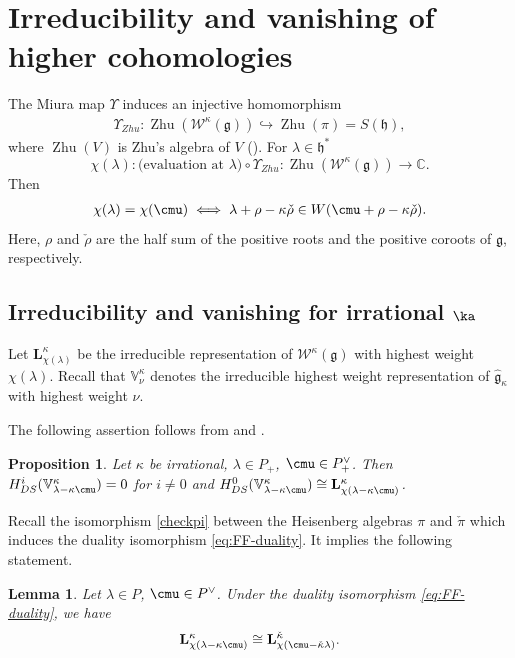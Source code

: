 \documentclass{amsart}
\newcommand{\on}{\operatorname}
\newcommand{\+}{\mathop{\oplus}}
\renewcommand{\*}{{\otimes}}
\newcommand{\mf}{\mathfrak}
\newcommand{\g}{\mf{g}}
\newcommand{\h}{\mf{h}}
\newcommand{\affg}{\widehat{\mf{g}}}
\newcommand{\C}{\mathbb{C}}
\newcommand{\W}{\mathscr{W}}
\newcommand{\ra}{\rightarrow}
\newcommand{\lam}{\lambda}
\theoremstyle{theorem}
\newtheorem{Pro}[Th]{Proposition}
\newtheorem{Lem}[Th]{Lemma}
\theoremstyle{remark}
\numberwithin{equation}{section}
\begin{document}
\section{Irreducibility and vanishing of higher
  cohomologies}\label{sec:proof}

The Miura map
$\Upsilon$ induces an injective homomorphism
\begin{align}
\Upsilon_{Zhu}:\on{Zhu}(\W^\kappa(\g))\hookrightarrow \on{Zhu}(\pi)=S(\mf{h}),
\end{align}
where $\on{Zhu}(V)$ is Zhu's algebra of $V$ (\cite{ACL17}).
For $\lam\in \h^*$
$$\chi(\lam):\text{(evaluation at $\lam$)} \circ \Upsilon_{Zhu}:\on{Zhu}(\W^\kappa(\g))\ra \C.$$
Then 
\begin{align}
\chi(\lam)=\chi(\cmu)\iff \lam+\rho-\kappa \check{\rho} \in W(\cmu+\rho-\kappa\check{\rho}).
\label{eq:hw}
\end{align}
Here, $\rho$ and $\check{\rho}$ are the half sum of the positive roots
and the positive coroots of $\g$, respectively.

\subsection{Irreducibility and vanishing for irrational
  $\ka$}    \label{irrvan}

Let $\mathbf{L}_{\chi(\lam)}^\kappa$ be the irreducible
representation of $\W^\kappa(\g)$ with highest weight
$\chi(\lam)$. Recall that $\mathbb{V}_{\nu}^\kappa$ denotes the
irreducible highest weight representation of $\affg_\kappa$ with
highest weight $\nu$.

The following assertion follows from  \cite{Ara04} and \cite[Theorem
9.14]{Ara07}.
\begin{Pro}    \label{irr}
Let $\kappa$ be irrational,
 $\lam\in P_+$, $\cmu\in P^{\vee}_+$.
Then
$H^i_{DS}(\mathbb{V}_{\lam-\kappa\cmu}^\kappa)=0$ for $i\ne 0$
and
$H^0_{DS}(\mathbb{V}_{\lam-\kappa\cmu}^\kappa) \cong
\mathbf{L}_{\chi(\lam-\kappa\cmu)}^\kappa$.
\end{Pro}

Recall the isomorphism \eqref{checkpi} between the Heisenberg algebras
$\pi$ and $\check\pi$ which induces the duality isomorphism
\eqref{eq:FF-duality}. It implies the following statement.

\begin{Lem}\label{Lem:symmetry}
Let $\lam\in P$,  $\cmu\in P^{\vee}$.
Under the duality isomorphism \eqref{eq:FF-duality}, we have
\begin{align*}
\mathbf{L}_{\chi(\lam-\kappa\cmu)}^\kappa\cong
\mathbf{L}_{\chi(\cmu-\check{\kappa}\lam)}^{\check{\kappa}}.
\end{align*}
\end{Lem}
\end{document}
